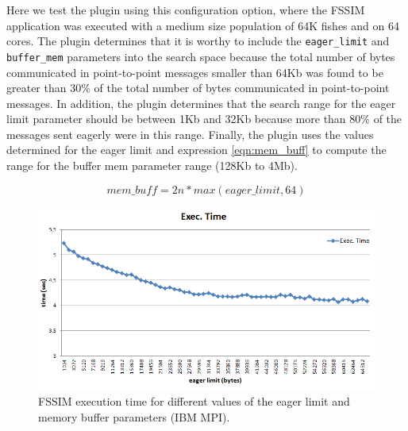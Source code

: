 Here we test the plugin using this configuration option, where the FSSIM application was executed with a medium size population of 64K fishes and on 64 cores. The plugin determines that it is worthy to include the {\tt eager\_limit} and {\tt buffer\_mem} parameters into the search space because the total number of bytes communicated in point-to-point messages smaller than 64Kb was found to be greater than 30\% of the total number of bytes communicated in point-to-point messages. In addition, the plugin determines that the search range for the eager limit parameter should be between 1Kb and 32Kb because more than 80\% of the messages sent eagerly were in this range. Finally, the plugin uses the values determined for the eager limit and expression \ref{eqn:mem_buff} to compute the range for the buffer mem parameter range (128Kb to 4Mb).

\begin{equation}
	mem\_buff = 2{n}*{max(eager\_limit,64)}
\label{eqn:mem_buff}
\end{equation}

\begin{figure}[bth]
  \center
  \includegraphics[width=0.65\paperwidth]{../BPG/images/MPIFssimEager.png}
	\caption{FSSIM execution time for different values of the eager limit and memory buffer parameters (IBM MPI).}
	\label{fig:fssimEager}
\end{figure}

